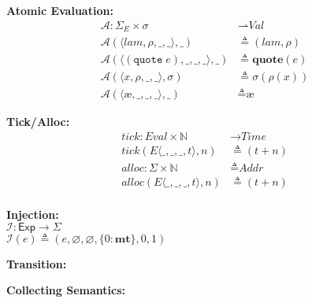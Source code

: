 \documentclass[12pt,draft]{article}
\newcommand\mae{\ensuremath{\text{\ae}}}
\newcommand{\quotesyn}[1]{(\texttt{quote}\;#1)}
\begin{document}
{\begin{multicols*}{2}
\begin{center}
\end{center}
\vspace{-7mm}
\begin{center}
\textbf{Atomic Evaluation:}
\vspace{-3mm}
\begin{align*}
\mathcal{A} : \Sigma_E \times \sigma &\rightharpoonup \textit{Val} \\
\mathcal{A}( \langle lam , \rho , \_ , \_ \rangle, \_)  &\triangleq (lam , \rho) \\
\mathcal{A}( \langle \quotesyn{e} , \_ , \_ , \_ \rangle, \_)  &\triangleq \textbf{quote}(e) \\
\mathcal{A}( \langle x , \rho , \_ , \_ \rangle, \sigma) &\triangleq \sigma(\rho(x)) \\
\mathcal{A}( \langle \mae , \_ , \_ , \_ \rangle, \_) &\triangleq \mae
\end{align*}
\end{center}
\vspace{-7mm}
\begin{center}
\textbf{Tick/Alloc:}
\vspace{-3mm}
\begin{align*}
tick : \textit{Eval} \times \mathbb{N} &\rightarrow \textit{Time} \\
tick(E\langle \_, \_ , \_, t \rangle, n) &\triangleq (t + n) \\
alloc : \Sigma \times \mathbb{N} &\triangleq \textit{Addr} \\
alloc(E\langle \_, \_ , \_, t \rangle, n) &\triangleq (t + n) \\
\end{align*}
\end{center}
\vspace{-14mm}
\begin{center}
\textbf{Injection:} \\
$\mathcal{I} : \textsf{Exp} \rightarrow \Sigma$ \\
$\mathcal{I}(e) \triangleq (e , \varnothing , \varnothing , \{0 : \textbf{mt}\} , 0 , 1)$
\end{center}
\vspace{-8mm}
\begin{center}
\textbf{Transition:}
\end{center}
\vspace{-10mm}
\begin{center}
\textbf{Collecting Semantics:}
\end{center}
\vspace{-10mm}



\end{multicols*}}
\end{document}
